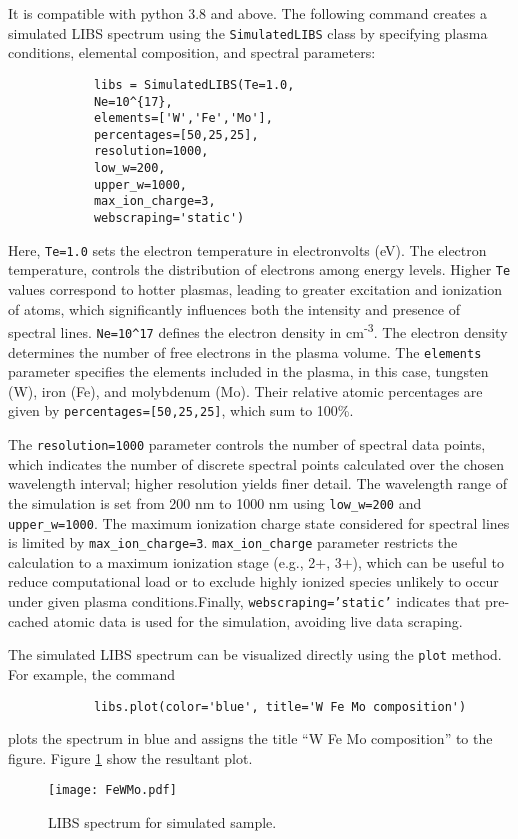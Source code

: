 \documentclass[12pt,a4paper]{article}
\begin{document}
		It is compatible with python 3.8 and above. The following command creates a simulated LIBS spectrum using the \texttt{SimulatedLIBS} class by specifying plasma conditions, elemental composition, and spectral parameters:
		\vspace{-0.5em}
		\begin{verbatim}
			libs = SimulatedLIBS(Te=1.0,
			Ne=10^{17},
			elements=['W','Fe','Mo'],
			percentages=[50,25,25],
			resolution=1000,
			low_w=200,
			upper_w=1000,
			max_ion_charge=3,
			webscraping='static')
		\end{verbatim}
		\vspace{-1.5em}
		
		Here, \texttt{Te=1.0} sets the electron temperature in electronvolts (eV). The electron temperature, controls the distribution of electrons among energy levels. Higher \texttt{Te} values correspond to hotter plasmas, leading to greater excitation and ionization of atoms, which significantly influences both the intensity and presence of spectral lines. \texttt{Ne=10\textasciicircum17} defines the electron density in cm\textsuperscript{-3}. The electron density  determines the number of free electrons in the plasma volume. The \texttt{elements} parameter specifies the elements included in the plasma, in this case, tungsten (W), iron (Fe), and molybdenum (Mo). Their relative atomic percentages are given by \texttt{percentages=[50,25,25]}, which sum to 100\%.
		
		The \texttt{resolution=1000} parameter controls the number of spectral data points, which indicates the number of discrete spectral points calculated over the chosen wavelength interval; higher resolution yields finer detail. The wavelength range of the simulation is set from 200 nm to 1000 nm using \texttt{low\_w=200} and \texttt{upper\_w=1000}. The maximum ionization charge state considered for spectral lines is limited by \texttt{max\_ion\_charge=3}. \texttt{max\_ion\_charge} parameter restricts the calculation to a maximum ionization stage (e.g., 2+, 3+), which can be useful to reduce computational load or to exclude highly ionized species unlikely to occur under given plasma conditions.Finally, \texttt{webscraping='static'} indicates that pre-cached atomic data is used for the simulation, avoiding live data scraping.
		
		The simulated LIBS spectrum can be visualized directly using the \texttt{plot} method. For example, the command
		
		\vspace{-0.5em}
		\begin{verbatim}
			libs.plot(color='blue', title='W Fe Mo composition')
		\end{verbatim}
		\vspace{-1.5em}
		plots the spectrum in blue and assigns the title ``W Fe Mo composition'' to the figure. Figure \ref*{fig:libs-spectrum-FeWMo} show the resultant plot.
		\begin{figure}[h!]
			\centering
			\texttt{[image: FeWMo.pdf]}
			\caption{LIBS spectrum for simulated sample.}
			\label{fig:libs-spectrum-FeWMo}
		\end{figure}
		
\end{document}
